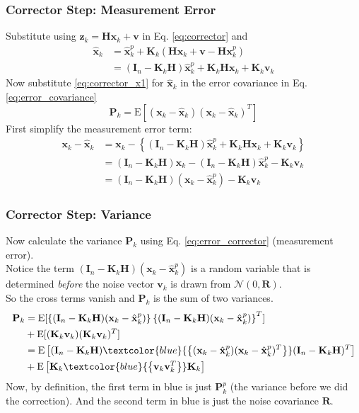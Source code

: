 \documentclass{beamer}
\renewcommand{\vec}[1]{\mathbf{#1}}
\newcommand{\vx}{\vec{x}}
\newcommand{\vz}{\vec{z}}
\newcommand{\vv}{\vec{v}}
\newcommand{\vP}{\vec{P}}
\newcommand{\vK}{\vec{K}}
\newcommand{\vH}{\vec{H}}
\newcommand{\vR}{\vec{R}}
\newcommand{\N}{\mathcal{N}}
\newcommand{\lb}{\left\lbrace}
\newcommand{\rb}{\right\rbrace}
\newcommand{\vxh}{\hat{\vx}}
\newcommand{\Id}{\vec{I}}
\newcommand{\E}{\mathrm{E}}
\begin{document}
\begin{frame}
\frametitle{Corrector Step: Measurement Error}
Substitute using $\vz_k = \vH \vx_k + \vv$ in Eq. \ref{eq:corrector} and
\begin{equation}
\begin{aligned}
\label{eq:corrector_x1}
 \vxh_k &= \vxh_k^p + \vK_k (\vH \vx_k + \vv - \vH \vx_k^p) \\
&= (\Id_n - \vK_k \vH) \vxh_k^p + \vK_k \vH \vx_k + \vK_k \vv_k
\end{aligned}
\end{equation}
Now substitute \eqref{eq:corrector_x1} for $\vxh_k$ in the error covariance in Eq. \ref{eq:error_covariance}
\[ \vP_k = \E[ (\vx_k - \vxh_k) (\vx_k - \vxh_k)^T ] \]
First simplify the measurement error term:
\begin{equation} 
\begin{aligned}
\label{eq:error_corrector}
\vx_k - \vxh_k &= \vx_k - \lb  (\Id_n - \vK_k \vH) \vxh_k^p + \vK_k \vH \vx_k + \vK_k \vv_k \rb \\
&= (\Id_n - \vK_k \vH) \vx_k  - (\Id_n - \vK_k \vH) \vxh_k^p - \vK_k \vv_k \\
&= (\Id_n - \vK_k \vH) (\vx_k  - \vxh_k^p) - \vK_k \vv_k
\end{aligned}
\end{equation}
\end{frame}

\begin{frame}
\frametitle{Corrector Step: Variance}
Now calculate the variance $\vP_k$ using Eq. \ref{eq:error_corrector} (measurement error).\\
Notice the term $(\Id_n - \vK_k \vH) (\vx_k  - \vxh_k^p)$ is a random variable that is
determined \textit{before} the noise vector $\vv_k$ is drawn from $\N(0, \vR)$. \\
So the cross terms vanish and $\vP_k$ is the sum of two variances.
\begin{equation}
\begin{aligned}
\vP_k &= \E[\lb(\Id_n- \vK_k \vH)(\vx_k  - \vxh_k^p)\rb \lb(\Id_n- \vK_k \vH)(\vx_k  - \vxh_k^p)\rb^T ] \\
&+ \E[(\vK_k \vv_k)(\vK_k \vv_k)^T] \\
&= \E \left[ (\Id_n- \vK_k \vH) \textcolor{blue}{\lb(\vx_k  - \vxh_k^p) (\vx_k  - \vxh_k^p)^T \rb}(\Id_n- \vK_k \vH)^T \right] \\
& +\E \left[ \vK_k \textcolor{blue}{\lb\vv_k \vv_k^T\rb} \vK_k \right]
\end{aligned}
\end{equation}
Now, by definition, the first term in blue is just $\vP^p_k$ (the variance before we did the correction).
And the second term in blue is just the noise covariance $\vR$.
\end{frame}
\end{document}
